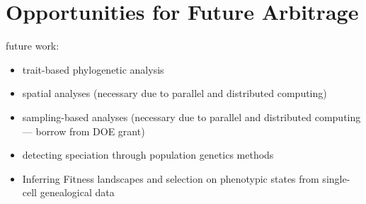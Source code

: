 \section{Opportunities for Future Arbitrage} \label{sec:opportunities}

future work:
\begin{itemize}
  \item trait-based phylogenetic analysis
  \item spatial analyses (necessary due to parallel and distributed computing)
  \item sampling-based analyses (necessary due to parallel and distributed computing --- borrow from DOE grant)
  \item detecting speciation through population genetics methods \citep{sukumaran2021incorporating}
  \item Inferring Fitness landscapes and selection on phenotypic states from single-cell genealogical data \citep{nozoe2017inferring}
\end{itemize}
